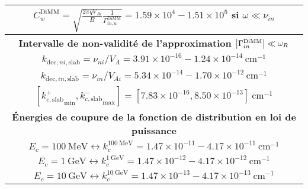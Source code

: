 \documentclass[10pt,a4paper]{article}
\begin{document}
\begin{center}
\begin{tabular}{|c|}
$C^\mathrm{DiMM}_w = \sqrt{\frac{2\pi qV_{Ai}}{B} \frac{1}{\Gamma^\mathrm{DiMM}_{in,w}}} = 1.59\times 10^4 - 1.51 \times 10^5$ si $\omega \ll \nu_{in}$ \\ 
\hline 
\hline
\bf{Intervalle de non-validité de l'approximation $\abs{\Gamma^\mathrm{DiMM}_{in}} \ll \omega_R$} \\ 
\hline
$k_{\mathrm{dec},ni,\mathrm{slab}} = \nu_{ni}/V_A = 3.91\times 10^{-16} - 1.24 \times 10^{-14} ~ \mathrm{cm}^{-1}$ \\ 
$k_{\mathrm{dec},in,\mathrm{slab}} = \nu_{in}/V_{Ai} = 5.34\times 10^{-14} - 1.70 \times 10^{-12} ~ \mathrm{cm}^{-1}$ \\ 
$\left[{k^+_{c,\mathrm{slab}}}_\mathrm{min}, {k^-_{c,\mathrm{slab}}}_\mathrm{max} \right] = [7.83 \times 10^{-16}, 8.50\times 10^{-13}] ~ \mathrm{cm}^{-1}$ \\ 
\hline
\hline
\bf{Énergies de coupure de la fonction de distribution en loi de puissance} \\ 
\hline
$E_c = 100~\mathrm{MeV} \leftrightarrow k^{100~\mathrm{MeV}}_c = 1.47\times 10^{-11} - 4.17 \times 10^{-11}~\mathrm{cm}^{-1}$ \\ 
$E_c = 1~\mathrm{GeV} \leftrightarrow k^{1~\mathrm{GeV}}_c = 1.47\times 10^{-12} - 4.17 \times 10^{-12} ~\mathrm{cm}^{-1}$     \\ 
$E_c = 10~\mathrm{GeV} \leftrightarrow k^{10~\mathrm{GeV}}_c = 1.47\times 10^{-13} - 4.17 \times 10^{-13}~\mathrm{cm}^{-1}$   \\ 
\hline

\end{tabular}
\label{param_DiMM}




\end{center}
\end{document}
